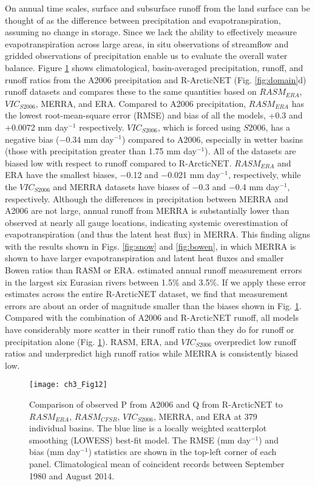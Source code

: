 On annual time scales, surface and subsurface runoff from the land surface can be thought of as the difference between precipitation and evapotranspiration, assuming no change in storage.
Since we lack the ability to effectively measure evapotranspiration across large areas, in situ observations of streamflow and gridded observations of precipitation enable us to evaluate the overall water balance.
Figure \ref{fig:streamflow_scatter} shows climatological, basin-averaged precipitation, runoff, and runoff ratios from the A2006 precipitation and R-ArcticNET (Fig. \ref{fig:domain}d) runoff datasets and compares these to the same quantities based on $RASM_{ERA}$, $VIC_{S2006}$, MERRA, and ERA.
Compared to A2006 precipitation, $RASM_{ERA}$ has the lowest root-mean-square error (RMSE) and bias of all the models, +0.3 and +0.0072 mm day$^{−1}$ respectively.
$VIC_{S2006}$, which is forced using $S2006$, has a negative bias (−0.34 mm day$^{−1}$) compared to A2006, especially in wetter basins (those with precipitation greater than 1.75 mm day$^{−1}$).
All of the datasets are biased low with respect to runoff compared to R-ArcticNET.
$RASM_{ERA}$ and ERA have the smallest biases, −0.12 and −0.021 mm day$^{−1}$, respectively, while the $VIC_{S2006}$ and MERRA datasets have biases of −0.3 and −0.4 mm day$^{−1}$, respectively.
Although the differences in precipitation between MERRA and A2006 are not large, annual runoff from MERRA is substantially lower than observed at nearly all gauge locations, indicating systemic overestimation of evapotranspiration (and thus the latent heat flux) in MERRA.
This finding aligns with the results shown in Figs. \ref{fig:snow} and \ref{fig:bowen}, in which MERRA is shown to have larger evapotranspiration and latent heat fluxes and smaller Bowen ratios than RASM or ERA.
\citet{Shiklomanov_2006} estimated annual runoff measurement errors in the largest six Eurasian rivers between 1.5\% and 3.5\%.
If we apply these error estimates across the entire R-ArcticNET dataset, we find that measurement errors are about an order of magnitude smaller than the biases shown in Fig. \ref{fig:streamflow_scatter}.
Compared with the combination of A2006 and R-ArcticNET runoff, all models have considerably more scatter in their runoff ratio than they do for runoff or precipitation alone (Fig. \ref{fig:streamflow_scatter}).
RASM, ERA, and $VIC_{S2006}$ overpredict low runoff ratios and underpredict high runoff ratios while MERRA is consistently biased low.


\begin{figure}
  \centering
  \texttt{[image: ch3\_Fig12]}
  \caption{Comparison of observed P from A2006 and Q from R-ArcticNET to $RASM_{ERA}$, $RASM_{CFSR}$, $VIC_{S2006}$, MERRA, and ERA at 379 individual basins.
  The blue line is a locally weighted scatterplot smoothing (LOWESS) best-fit model.
  The RMSE (mm day$^{−1}$) and bias (mm day$^{−1}$) statistics are shown in the top-left corner of each panel.
  Climatological mean of coincident records between September 1980 and August 2014.}
  \label{fig:streamflow_scatter}
\end{figure}

